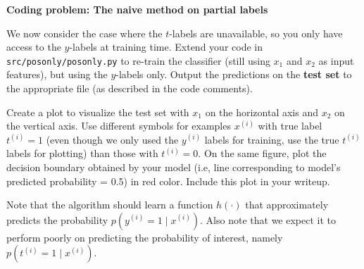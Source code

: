 \item {} \textbf{Coding problem: The naive method on partial labels}

We now consider the case where the $t$-labels are unavailable, so you only have
access to the $y$-labels at training time. Extend your code in
\texttt{src/posonly/posonly.py} to re-train the classifier (still using $x_1$ and
$x_2$ as input features), but using the $y$-labels only. Output the predictions
on the \textbf{test set} to the appropriate file (as described in the code comments).


Create a plot to visualize the test set with $x_1$ on the horizontal axis and $x_2$ on
the vertical axis. Use different symbols for examples $x^{(i)}$ with true label $t^{(i)} = 1$ (even though we only
used the $y^{(i)}$ labels for training, use the true $t^{(i)}$ labels for plotting)
than those with $t^{(i)} = 0$. On the same figure, plot the decision boundary obtained
by your model (i.e, line corresponding to model's predicted probability = 0.5) in red color. Include
this plot in your writeup.


Note that the algorithm should learn a function $h(\cdot)$ that approximately predicts the probability $p(y^{(i)}=1\mid x^{(i)})$. Also note that we expect it to perform poorly on predicting the probability of interest, namely $p(t^{(i)}=1\mid x^{(i)})$.

